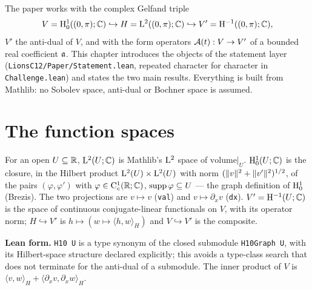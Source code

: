 The paper works with the complex Gelfand triple
\[
  V=\mathrm{H}_0^1((0,\pi);\mathbb{C})\hookrightarrow H=\mathrm{L}^2((0,\pi);\mathbb{C})\hookrightarrow V'=\mathrm{H}^{-1}((0,\pi);\mathbb{C}),
\]
$V'$ the anti-dual of $V$, and with the form operators $\mathcal{A}(t):V\to V'$ of a bounded real
coefficient $\mathfrak{a}$.  This chapter introduces the objects of the statement layer
(\texttt{LionsC12/Paper/Statement.lean}, repeated character for character in
\texttt{Challenge.lean}) and states the two main results.  Everything is built from Mathlib: no
Sobolev space, anti-dual or Bochner space is assumed.

\section{The function spaces}

\begin{definition}
  \label{def:spaces}
  \leanok
  For an open $U\subseteq\mathbb{R}$, $\mathrm{L}^2(U;\mathbb{C})$ is Mathlib's $\mathrm{L}^2$ space of
  $\mathrm{volume}|_U$.  $\mathrm{H}_0^1(U;\mathbb{C})$ is the closure, in the Hilbert product
  $\mathrm{L}^2(U)\times\mathrm{L}^2(U)$ with norm $(\lVert v\rVert^2+\lVert v'\rVert^2)^{1/2}$, of the pairs
  $(\varphi,\varphi')$ with $\varphi\in\mathrm{C}_c^1(\mathbb{R};\mathbb{C})$, $\operatorname{supp}\varphi\subseteq U$ --- the graph
  definition of $\mathrm{H}_0^1$ (Brezis).  The two projections are $v\mapsto v$ (\texttt{val}) and
  $v\mapsto\partial_xv$ (\texttt{dx}).  $V'=\mathrm{H}^{-1}(U;\mathbb{C})$ is the space of continuous
  conjugate-linear functionals on $V$, with its operator norm; $H\hookrightarrow V'$ is
  $h\mapsto(w\mapsto\langle h,w\rangle_H)$ and $V\hookrightarrow V'$ is the composite.
\end{definition}

\textbf{Lean form.}  \texttt{H10 U} is a type synonym of the closed submodule
\texttt{H10Graph U}, with its Hilbert-space structure declared explicitly; this avoids a
type-class search that does not terminate for the anti-dual of a submodule.  The inner product
of $V$ is $\langle v,w\rangle_H+\langle\partial_xv,\partial_xw\rangle_H$.

